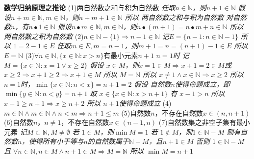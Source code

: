 \documentclass[11pt]{article}
\begin{document}
\textbf{数学归纳原理之推论}
\newline
(1)两自然数之和与积为自然数
\newline
\textit{任取$n \in \mathbb{N}$，则$n+1 \in \mathbb{N}$
\newline
假设$n+m \in \mathbb{N}, m \in \mathbb{N}$，则$n+m+1 \in \mathbb{N}$
\newline
所以 两自然数之和与积为自然数
\newline
对自然数$n$，有$n \bullet 1 \in \mathbb{N}$
\newline
假设$n \bullet m \in \mathbb{N}, m \in \mathbb{N}$，则$n\bullet(m+1)=n\bullet m+n \in \mathbb{N}$
\newline
所以 两自然数之积为自然数}
\newline
(2)$n \in \mathbb{N}-\{1\} \Rightarrow n-1 \in \mathbb{N}$
\newline
\textit{记$E=\{n-1:n\in \mathbb{N}-{1}\}$
\newline
所以 $1=2-1 \in E$
\newline
任取$m \in E, m=n-1$，则$m+1=n=(n+1)-1 \in E$
\newline
所以 $E=\mathbb{N}$}
\newline
(3)$\forall n \in \mathbb{N}, \{x\in\mathbb{N}:x>n\}$有最小元素$n+1$
\newline
\textit{$n=1$时
\newline
记 $M=\{x\in\mathbb{N}: x=1 \lor x\ge2\}$
\newline
假设 $x\in M$，则$x=1\in M\Rightarrow x+1=2\in M$或$x\ge2\Rightarrow x+1\ge2\Rightarrow x+1\in M$
\newline
所以 $M=\mathbb{N}$
\newline
所以 $x\not = 1\land x\in\mathbb{N}\Rightarrow x\ge2$
\newline
所以 $n=1$时，$\min\{x\in\mathbb{N}:n<x\}=n+1=2$
\newline
假设 自然数$n$使得命题成立，即$\min\{y\in\mathbb{N}:n<y\}=n+1$
\newline
取 $x\in\{x\in\mathbb{N}:x>n+1\}$
\newline
有 $x-1>n$
\newline
所以 $x-1\ge n+1\Rightarrow x\ge n+2$
\newline
所以 $n+1$使得命题成立}
\newline
(4)$m\in\mathbb{N} \land m\in\mathbb{N} \land n<m \Rightarrow n+1\le m$
\newline
(5)自然数$n$，不存在自然数$x\in (n,n+1)$
\newline
(6)自然数$n$，$n\not = 1$，不存在自然数$x\in (n-1,n)$
\newline
(7)自然数集之非空子集有最小元素
\newline
\textit{记$M\subset\mathbb{N}, M\not = \emptyset$
\newline
若 $1\in M$，则$\min M=1$
\newline
若 $1\not\in M$，则$1\in\mathbb{N}-M$
\newline
则有自然数$n$，使得所有小于等与$n$的自然数属于$\mathbb{N}-M$，且$n+1\in M$
\newline
否则 $1\in\mathbb{N}-M$ 且 $\forall n\in\mathbb{N}, n\in M\land n+1\in M \Rightarrow M=\mathbb{N}$
\newline
所以 $\min M=n+1$}
\newline
\end{document}
